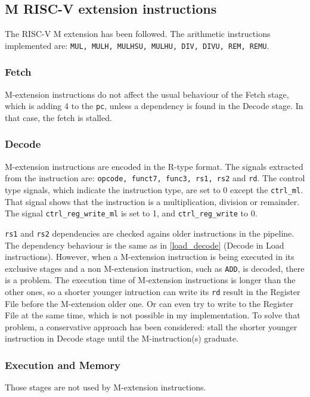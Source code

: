 \subsection{M RISC-V extension instructions}
The RISC-V M extension has been followed.
The arithmetic instructions implemented are: \texttt{MUL, MULH, MULHSU, MULHU, DIV, DIVU, REM, REMU}.

\subsubsection{Fetch}
M-extension instructions do not affect the usual behaviour of the Fetch stage, which is adding 4 to the \texttt{pc}, unless a dependency is found in the Decode stage.
In that case, the fetch is stalled.

\subsubsection{Decode}
M-extension instructions are encoded in the R-type format.
The signals extracted from the instruction are: \texttt{opcode, funct7, func3, rs1, rs2} and \texttt{rd}.
The control type signals, which indicate the instruction type, are set to 0 except the \texttt{ctrl\_ml}. That signal shows that the instruction is a multiplication, division or remainder.
The signal \texttt{ctrl\_reg\_write\_ml} is set to 1, and \texttt{ctrl\_reg\_write} to 0.

\texttt{rs1} and \texttt{rs2} dependencies are checked agains older instructions in the pipeline. 
The dependency behaviour is the same as in \autoref{load_decode} (Decode in Load instructions).
However, when a M-extension instruction is being executed in its exclusive stages and a non M-extension instruction, such as \texttt{ADD}, is decoded, there is a problem. 
The execution time of M-extension instructions is longer than the other ones, so a shorter younger intruction can write its \texttt{rd} result in the Register File before the M-extension older one. Or can even try to write to the Register File at the same time, which is not possible in my implementation.
To solve that problem, a conservative approach has been considered: stall the shorter younger instruction in Decode stage until the M-instruction(s) graduate.


\subsubsection{Execution and Memory}
Those stages are not used by M-extension instructions.


